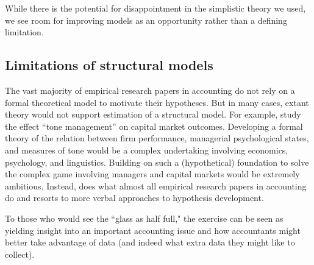 While there is the potential for disappointment in the simplistic theory we used, we see room for improving models as an opportunity rather than a defining limitation.

\subsection{Limitations of structural models}
The vast majority of empirical research papers in accounting do not rely on a formal theoretical model to motivate their hypotheses.
But in many cases, extant theory would not support estimation of a structural model.
For example, \citet{Huang:2014cs} study the effect ``tone management'' on capital market outcomes.
Developing a formal theory of the relation between firm performance, managerial psychological states, and measures of tone would be a complex undertaking involving economics, psychology, and linguistics.
Building on such a (hypothetical) foundation to solve the complex game involving managers and capital markets would be extremely ambitious.
Instead, \citet{Huang:2014cs} does what almost all empirical research papers in accounting do and resorts to more verbal approaches to hypothesis development. 

To those who would see the ``glass as half full," the exercise can be seen as yielding insight into an important accounting issue and how accountants might better take advantage of data (and indeed what extra data they might like to collect).
